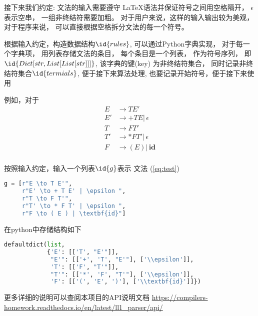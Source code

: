 \documentclass[../report]{subfiles}
\begin{document}
接下来我们约定:
文法的输入需要遵守 \LaTeX 语法并保证符号之间用空格隔开，
$\epsilon$ 表示空串，
一组非终结符需要加粗。
对于用户来说，这样的输入输出较为美观，
对于程序来说， 可以直接根据空格拆分文法的每一个符号。

根据输入约定，构造数据结构$\id{rules}$,
可以通过Python字典实现，
对于每一个字典项，
用列表存储文法的条目，
每个条目是一个列表，
作为符号序列，
即$\id{Dict[str,List[List[str]]]}$,
该字典的键(key) 为非终结符集合，
同时记录非终结符集合$\id{termials}$,
便于接下来算法处理,
也要记录开始符号，便于接下来使用

例如，对于
\begin{equation}
  \begin{array}{ll}
		E & \to T E' \\
		E' & \to + T E |\, \epsilon \\
		T & \to F T' \\
		T' & \to *F T' |\, \epsilon \\
		F & \to ( E ) |\, \textbf{id}\\
  \end{array}
  \label{eq:test}
\end{equation}

按照输入约定，输入一个列表$\id{g}$表示
文法 (\ref{eq:test})
\begin{lstlisting}[language=python]
g = [r"E \to T E'",
     r"E' \to + T E' | \epsilon ",
     r"T \to F T'",
     r"T' \to * F T' | \epsilon ",
     r"F \to ( E ) | \textbf{id}"]
\end{lstlisting}

在python中存储结构如下
\begin{lstlisting}[language=python]
defaultdict(list,
            {'E': [['T', "E'"]],
             "E'": [['+', 'T', "E'"], ['\\epsilon']],
             'T': [['F', "T'"]],
             "T'": [['*', 'F', "T'"], ['\\epsilon']],
             'F': [['(', 'E', ')'], ['\\textbf{id}']]})
\end{lstlisting}


更多详细的说明可以查阅本项目的API说明文档
\url{https://compilers-homework.readthedocs.io/en/latest/ll1_parser/api/}
\end{document}
